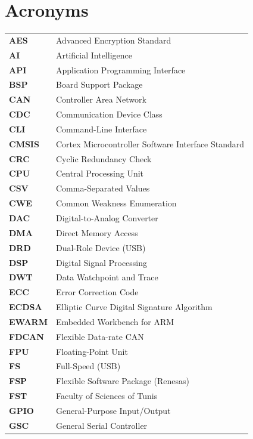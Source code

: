 \chapter{Acronyms}

\begin{longtable}{@{}p{}p{}@{}}

\textbf{AES} & Advanced Encryption Standard \\
\textbf{AI} & Artificial Intelligence \\
\textbf{API} & Application Programming Interface \\
\textbf{BSP} & Board Support Package \\
\textbf{CAN} & Controller Area Network \\
\textbf{CDC} & Communication Device Class \\
\textbf{CLI} & Command-Line Interface \\
\textbf{CMSIS} & Cortex Microcontroller Software Interface Standard \\
\textbf{CRC} & Cyclic Redundancy Check \\
\textbf{CPU} & Central Processing Unit \\
\textbf{CSV} & Comma-Separated Values \\
\textbf{CWE} & Common Weakness Enumeration \\
\textbf{DAC} & Digital-to-Analog Converter \\
\textbf{DMA} & Direct Memory Access \\
\textbf{DRD} & Dual-Role Device (USB) \\
\textbf{DSP} & Digital Signal Processing \\
\textbf{DWT} & Data Watchpoint and Trace \\
\textbf{ECC} & Error Correction Code \\
\textbf{ECDSA} & Elliptic Curve Digital Signature Algorithm \\
\textbf{EWARM} & Embedded Workbench for ARM \\
\textbf{FDCAN} & Flexible Data-rate CAN \\
\textbf{FPU} & Floating-Point Unit \\
\textbf{FS} & Full-Speed (USB) \\
\textbf{FSP} & Flexible Software Package (Renesas) \\
\textbf{FST} & Faculty of Sciences of Tunis \\
\textbf{GPIO} & General-Purpose Input/Output \\
\textbf{GSC} & General Serial Controller \\

\end{longtable}
